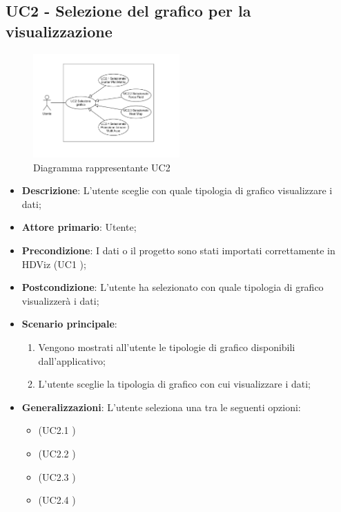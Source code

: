 \subsection{UC2 - Selezione del grafico per la visualizzazione}
\label{sub:uc2}

\begin{figure}[h]
    \centering
    \includegraphics[width=0.5\textwidth]{componenti/casi-duso/diagrammi/UC2.pdf}
    \caption{Diagramma rappresentante UC2}
    \label{fig:UC2}
\end{figure}

\begin{itemize}
	\item \textbf{Descrizione}: L'utente sceglie con quale tipologia di grafico visualizzare i dati;
	\item \textbf{Attore primario}: Utente;
	\item \textbf{Precondizione}: I dati o il progetto sono stati importati correttamente in HDViz (UC1 );
	\item \textbf{Postcondizione}: L'utente ha selezionato con quale tipologia di grafico visualizzerà i dati;
	\item \textbf{Scenario principale}:
		\begin{enumerate}
			\item Vengono mostrati all'utente le tipologie di grafico disponibili dall'applicativo;
			\item L'utente sceglie la tipologia di grafico con cui visualizzare i dati;
		\end{enumerate}
	\item \textbf{Generalizzazioni}: L'utente seleziona una tra le seguenti opzioni:
		\begin{itemize}
			\item {} (UC2.1 )
			\item {} (UC2.2 )
			\item {} (UC2.3 )
			\item {} (UC2.4 )
		\end{itemize}
\end{itemize}


